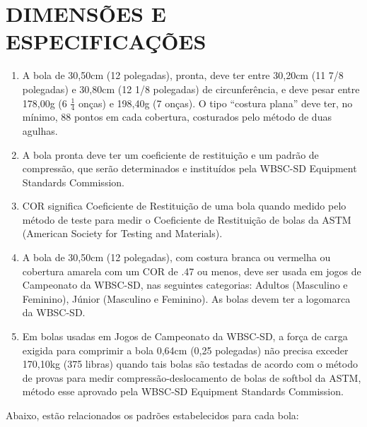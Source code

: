 \section{DIMENSÕES E ESPECIFICAÇÕES}
\begin{multicols}{2}
	\begin{enumerate}[label= \arabic*)]
		\item  A bola de 30,50cm (12 polegadas), pronta, deve ter entre 30,20cm (11 7/8
		polegadas) e 30,80cm (12 1/8 polegadas) de circunferência, e deve pesar entre
		178,00g (6 $\frac{1}{4}$ onças) e 198,40g (7 onças). O tipo “costura plana” deve ter, no mínimo,
		88 pontos em cada cobertura, costurados pelo método de duas agulhas.
		\item  A bola pronta deve ter um coeficiente de restituição e um padrão de compressão,
		que serão determinados e instituídos pela WBSC-SD Equipment Standards
		Commission.
		\item  COR significa Coeficiente de Restituição de uma bola quando medido pelo método
		de teste para medir o Coeficiente de Restituição de bolas da ASTM (American Society
		for Testing and Materials).
		\item  A bola de 30,50cm (12 polegadas), com costura branca ou vermelha ou cobertura
		amarela com um COR de .47 ou menos, deve ser usada em jogos de Campeonato da
		WBSC-SD, nas seguintes categorias: Adultos (Masculino e Feminino), Júnior (Masculino
		e Feminino). As bolas devem ter a logomarca da WBSC-SD.
		\item  Em bolas usadas em Jogos de Campeonato da WBSC-SD, a força de carga exigida
		para comprimir a bola 0,64cm (0,25 polegadas) não precisa exceder 170,10kg (375 libras) quando tais bolas são testadas de acordo com o método de provas para medir compressão-deslocamento de bolas de softbol da ASTM, método esse aprovado pela WBSC-SD Equipment Standards Commission.
	\end{enumerate}
\end{multicols}
Abaixo, estão relacionados os padrões estabelecidos para cada bola:



